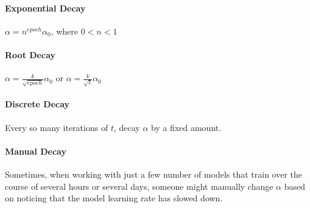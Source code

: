 \documentclass{article}
\begin{document}
\paragraph{Exponential Decay}

$\alpha = n^{epoch} \alpha_0$, where $0 < n < 1$

\paragraph{Root Decay}

$\alpha = \frac{k}{\sqrt{epoch}} \alpha_0$ or $\alpha = \frac{k}{\sqrt{t}} \alpha_0$

\paragraph{Discrete Decay}

Every so many iterations of $t$, decay $\alpha$ by a fixed amount.

\paragraph{Manual Decay}

Sometimes, when working with just a few number of models that train over the course of several hours or several days, someone might manually change $\alpha$ based on noticing that the model learning rate has slowed down.
\end{document}

